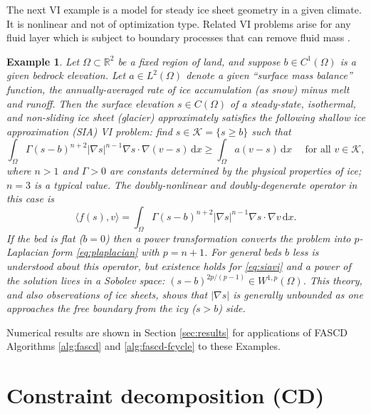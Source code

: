 \documentclass[letterpaper,final,12pt,reqno]{amsart}
\theoremstyle{cstyle}
\theoremstyle{cstyle*}
\theoremstyle{dstyle}
\newtheorem{example}[theorem]{Example}
\numberwithin{equation}{section}
\numberwithin{figure}{section}
\numberwithin{table}{section}
\numberwithin{theorem}{section}
\newcommand{\RR}{\mathbb{R}}
\newcommand{\grad}{\nabla}
\newcommand{\ip}[2]{\langle#1,#2\rangle}
\newcommand{\dx}{\, \mathrm{d}x}
\begin{document}
The next VI example is a model for steady ice sheet geometry in a given climate. It is nonlinear and not of optimization type. Related VI problems arise for any fluid layer which is subject to boundary processes that can remove fluid mass \cite{Bueler2021conservation}.

\begin{example}  \label{ex:sia}  Let $\Omega \subset \RR^2$ be a fixed region of land, and suppose $b \in C^1(\Omega)$ is a given bedrock elevation.  Let $a \in L^2(\Omega)$ denote a given ``surface mass balance'' function, the annually-averaged rate of ice accumulation (as snow) minus melt and runoff.  Then the surface elevation $s\in C(\Omega)$ of a steady-state, isothermal, and non-sliding ice sheet (glacier) approximately satisfies the following \emph{shallow ice approximation} (SIA) \cite{GreveBlatter2009} VI problem: find $s \in \mathcal{K} = \{s\ge b\}$ such that
\begin{equation}
\int_\Omega \Gamma (s-b)^{n+2} |\grad s|^{n-1} \grad s \cdot \grad (v-s) \dx \ge \int_\Omega a (v-s)\dx \quad \text{ for all } v \in \mathcal{K}, \label{eq:siavi}
\end{equation}
where $n>1$ and $\Gamma>0$ are constants determined by the physical properties of ice; $n=3$ is a typical value.  The doubly-nonlinear and doubly-degenerate operator in this case is
\begin{equation}
\ip{f(s)}{v} = \int_\Omega \Gamma (s-b)^{n+2} |\grad s|^{n-1} \grad s \cdot \grad v\dx. \label{eq:sia}
\end{equation}
If the bed is flat ($b=0$) then a power transformation converts the problem into $p$-Laplacian form \eqref{eq:plaplacian} with $p=n+1$.  For general beds $b$ less is understood about this operator, but existence holds for \eqref{eq:siavi} \cite{JouvetBueler2012} and a power of the solution lives in a Sobolev space: $(s-b)^{2p/(p-1)} \in W^{1,p}(\Omega)$.  This theory, and also observations of ice sheets, shows that $|\grad s|$ is generally unbounded as one approaches the free boundary from the icy ($s>b$) side.
\end{example}

Numerical results are shown in Section \ref{sec:results} for applications of FASCD Algorithms \ref{alg:fascd} and \ref{alg:fascd-fcycle} to these Examples.


\section{Constraint decomposition (CD)} \label{sec:cd}
\end{document}
